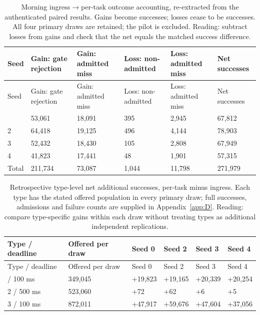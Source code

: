 \documentclass[12pt,a4paper]{article}
\begin{document}
\begingroup
\singlespacing\footnotesize\setlength{\tabcolsep}{3pt}
\renewcommand{\thetable}{C2}
\begin{xltabular}{\textwidth}{@{}YYYYYY@{}}
\caption[Morning outcome accounting]{Morning ingress\ensuremath{\to}per-task outcome accounting, re-extracted from the authenticated paired results. Gains become successes; losses cease to be successes. All four primary draws are retained; the pilot is excluded. Reading: subtract losses from gains and check that the net equals the matched success difference.}\label{tab:C2} \\
\toprule
Seed & Gain: gate rejection & Gain: admitted miss & Loss: non-admitted & Loss: admitted miss & Net successes \\
\midrule\endfirsthead
\toprule
Seed & Gain: gate rejection & Gain: admitted miss & Loss: non-admitted & Loss: admitted miss & Net successes \\
\midrule\endhead
\bottomrule{} & 53,061 & 18,091 & 395 & 2,945 & 67,812 \\
2 & 64,418 & 19,125 & 496 & 4,144 & 78,903 \\
3 & 52,432 & 18,430 & 105 & 2,808 & 67,949 \\
4 & 41,823 & 17,441 & 48 & 1,901 & 57,315 \\
Total & 211,734 & 73,087 & 1,044 & 11,798 & 271,979 \\
\end{xltabular}
\endgroup

\begingroup
\singlespacing\footnotesize\setlength{\tabcolsep}{3pt}
\renewcommand{\thetable}{C3}
\begin{xltabular}{\textwidth}{@{}YYYYYY@{}}
\caption[Type-level net changes]{Retrospective type-level net additional successes, per-task minus ingress. Each type has the stated offered population in every primary draw; full successes, admissions and failure counts are supplied in Appendix~\ref{app:D}. Reading: compare type-specific gains within each draw without treating types as additional independent replications.}\label{tab:C3} \\
\toprule
Type / deadline & Offered per draw & Seed 0 & Seed 2 & Seed 3 & Seed 4 \\
\midrule\endfirsthead
\toprule
Type / deadline & Offered per draw & Seed 0 & Seed 2 & Seed 3 & Seed 4 \\
\midrule\endhead
\bottomrule{} / 100 ms & 349,045 & +19,823 & +19,165 & +20,339 & +20,254 \\
2 / 500 ms & 523,060 & +72 & +62 & +6 & +5 \\
3 / 100 ms & 872,011 & +47,917 & +59,676 & +47,604 & +37,056 \\
\end{xltabular}
\endgroup
\end{document}
